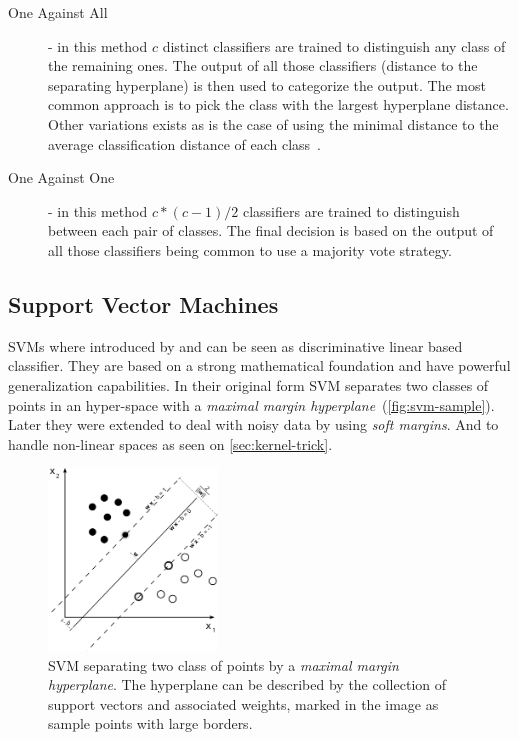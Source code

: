 \begin{description}
\item[One Against All] - in this method $c$ distinct classifiers are trained to
distinguish any class of the remaining ones. The output of all those classifiers
(distance to the separating hyperplane) is then used to categorize the output.
The most common approach is to pick the class with the largest hyperplane
distance. Other variations exists as is the case of using the minimal distance
to the average classification distance of each class~\citep{pronobis2007iros}.

\item[One Against One] - in this method $c*(c-1)/2$ classifiers are trained to
distinguish between each pair of classes. The final decision is based on the
output of all those classifiers being common to use a majority vote strategy.
\end{description}


\subsection{Support Vector Machines}
\Glspl{SVM} where introduced by \cite{cortes1995support} and can be seen as
discriminative linear based classifier. They are based on a strong mathematical
foundation and have powerful generalization capabilities. In their original form
\gls{SVM} separates two classes of points in an hyper-space with a
\emph{maximal margin hyperplane}~(\autoref{fig:svm-sample}).
Later they were extended to deal with noisy data by using \emph{soft margins}.
And to handle non-linear spaces as seen on \autoref{sec:kernel-trick}.

\begin{figure}[h]
\begin{center}
\includegraphics[width=0.4\textwidth]{figures/Svm_max_sep_hyperplane_with_margin}
\end{center}
\caption{{SVM} separating two class of points by a
         \emph{maximal margin hyperplane}. The hyperplane can be described by
         the collection of support vectors and associated weights, marked in the
         image as sample points with large borders.}
\label{fig:svm-sample}
\end{figure}

